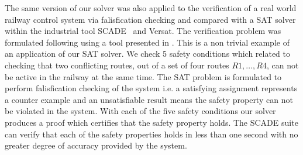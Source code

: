%
The same version of our solver was also applied to the verification of a real world railway control system via falisfication checking and compared with a SAT solver within the industrial tool SCADE~\cite{SCADE} and Versat. The verification problem was formulated following \cite{MS00} using a tool presented in \cite{KK08}. This is a non trivial example of an application of our SAT solver. We check 5 safety conditions which related to checking that two conflicting routes, out of a set of four routes $R1, \ldots, R4$, can not be active in the railway at the same time. The SAT problem is formulated to perform falisfication checking of the system i.e. a satisfying assignment represents a counter example and an unsatisfiable result means the safety property can not be violated in the system. With each of the five safety conditions our solver produces a proof which certifies that the safety property holds. The SCADE suite can verify that each of the safety properties holds in less than one second with no greater degree of accuracy provided by the system.

